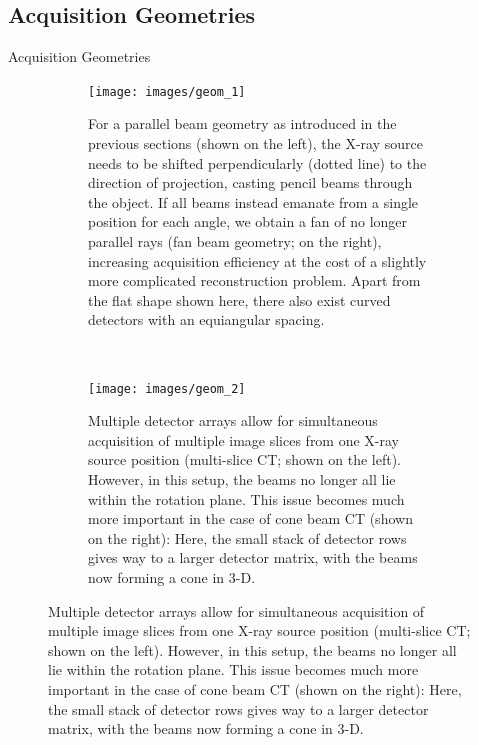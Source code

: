 \subsection{Acquisition Geometries}
\label{sub:ct_geom}

\begin{frame}[c,allowframebreaks]{Acquisition Geometries}

	\begin{figure}[tbp]
		\centering
		\begin{subfigure}[t]{0.9\linewidth}
			\centering{}
			\texttt{[image: images/geom\_1]}
			\caption{\footnotesize For a parallel beam geometry as introduced in the previous sections (shown on the left), the X-ray source needs to be shifted perpendicularly (dotted line) to the direction of projection, casting pencil beams through the object. If all beams instead emanate from a single position for each angle, we obtain a fan of no longer parallel rays (fan beam geometry; on the right), increasing acquisition efficiency at the cost of a slightly more complicated reconstruction problem. Apart from the flat shape shown here, there also exist curved detectors with an equiangular spacing.}
			\label{fig:ct_geom_1.1}
		\end{subfigure}\\[1cm]
		\begin{subfigure}[t]{0.9\linewidth}
			\centering{}
			\texttt{[image: images/geom\_2]}
			\caption{\footnotesize Multiple detector arrays allow for simultaneous acquisition of multiple image slices from one X-ray source position (multi-slice CT; shown on the left). However, in this setup, the beams no longer all lie within the rotation plane. This issue becomes much more important in the case of cone beam CT (shown on the right): Here, the small stack of detector rows gives way to a larger detector matrix, with the beams now forming a cone in 3-D.}
			\label{fig:ct_geom_1.2}
		\end{subfigure}
		\label{fig:ct_geom_1}
	\end{figure}

\end{frame}

